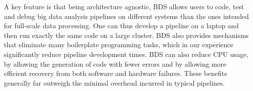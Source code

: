 A key feature is that being architecture agnostic, BDS allows users to code, test and debug big data analysis pipelines on different systems than the ones intended for full-scale data processing. One can thus develop a pipeline on a laptop and then run exactly the same code on a large cluster. BDS also provides mechanisms that eliminate many boilerplate programming tasks, which in our experience significantly reduce pipeline development times. BDS can also reduce CPU usage, by allowing the generation of code with fewer errors and by allowing more efficient recovery from both software and hardware failures. These benefits generally far outweigh the minimal overhead incurred in typical pipelines.

